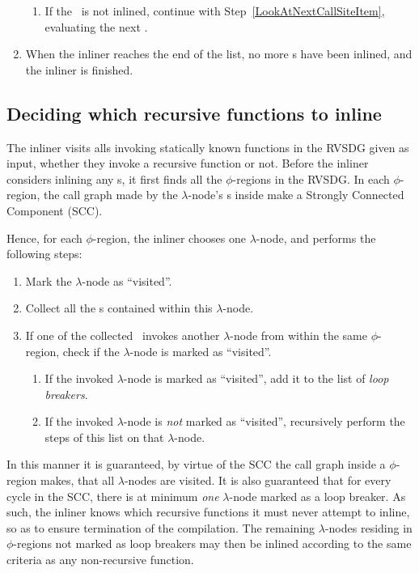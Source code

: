 \begin{enumerate}
\begin{enumerate}
		\item If the \applyNode~is not inlined, continue with
Step~\ref{LookAtNextCallSiteItem}, evaluating the next \applyNode .
		\label{InlineCallSiteItem}
	\end{enumerate}

	\item When the inliner reaches the end of the list, no more \applyNode s
have been inlined, and the inliner is finished.
\end{enumerate}

\subsection{Deciding which recursive functions to inline}
\label{sub:scheme:inlining_recur_apply_nodes}

The inliner visits all\applyNode s invoking statically known functions in the
RVSDG given as input, whether they invoke a recursive function or not. Before
the inliner considers inlining any \applyNode s, it first finds all the
$\phi$-regions in the RVSDG. In each $\phi$-region, the call graph made by the
$\lambda$-node's \applyNode s inside make a Strongly Connected Component (SCC).

Hence, for each $\phi$-region, the inliner chooses one $\lambda$-node, and
performs the following steps:

\begin{enumerate}
	\item Mark the $\lambda$-node as ``visited''.

	\item Collect all the \applyNode s contained within this $\lambda$-node.

	\item If one of the collected \applyNode~invokes another $\lambda$-node from
within the same $\phi$-region, check if the $\lambda$-node is marked as
``visited''.
	\begin{enumerate}
		\item If the invoked $\lambda$-node is marked as ``visited'', add it to
the list of \textit{loop breakers}.

		\item If the invoked $\lambda$-node is \textit{not} marked as
``visited'', recursively perform the steps of this list on that $\lambda$-node.
	\end{enumerate}
\end{enumerate}

In this manner it is guaranteed, by virtue of the SCC the call graph inside a
$\phi$-region makes, that all $\lambda$-nodes are visited. It is also guaranteed
that for every cycle in the SCC, there is at minimum \textit{one} $\lambda$-node
marked as a loop breaker. As such, the inliner knows which recursive functions
it must never attempt to inline, so as to ensure termination of the compilation.
The remaining $\lambda$-nodes residing in $\phi$-regions not marked as loop
breakers may then be inlined according to the same criteria as any non-recursive
function.

